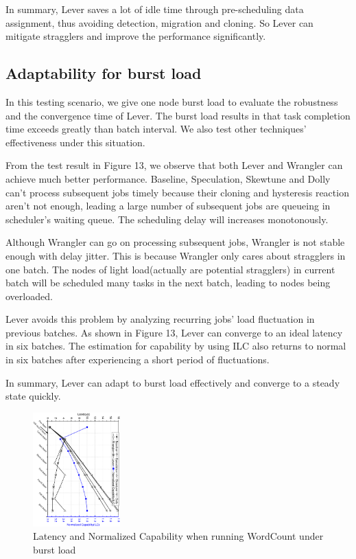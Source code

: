   In summary, Lever saves a lot of idle time through pre-scheduling data assignment, thus avoiding detection, migration and cloning. So Lever can mitigate stragglers and improve the performance significantly.

\subsection{Adaptability for burst load}

  In this testing scenario, we give one node burst load to evaluate the robustness and the convergence time of Lever. The burst load results in that task completion time exceeds greatly than batch interval. We also test other techniques' effectiveness under this situation.

  From the test result in Figure 13, we observe that both Lever and Wrangler can achieve much better performance. Baseline, Speculation, Skewtune and Dolly can't process subsequent jobs timely because their cloning and hysteresis reaction aren't not enough, leading a large number of subsequent jobs are queueing in scheduler's waiting queue. The scheduling delay will increases monotonously.

  Although Wrangler can go on processing subsequent jobs, Wrangler is not stable enough with delay jitter. This is because Wrangler only cares about stragglers in one batch. The nodes of light load(actually are potential stragglers) in current batch will be scheduled many tasks in the next batch, leading to nodes being overloaded.

  Lever avoids this problem by analyzing recurring jobs' load fluctuation in previous batches. As shown in Figure 13, Lever can converge to an ideal latency in six batches. The estimation for capability by using ILC also returns to normal in six batches after experiencing a short period of fluctuations.

  In summary, Lever can adapt to burst load effectively and converge to a steady state quickly.
  \begin{figure}[htbp]
    \centering
    \includegraphics[width=0.30\textwidth, angle=90]{FigureAdapBurst}
    \caption{Latency and Normalized Capability when running WordCount under burst load}
    \label{Fig. 13:}
  \end{figure}

